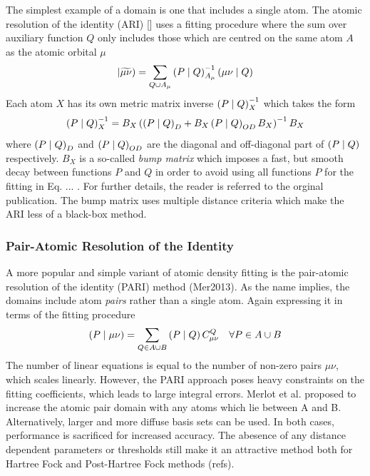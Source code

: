 The simplest example of a domain is one that includes a single atom. The atomic resolution of the identity (ARI) [] uses a fitting procedure where the sum over auxiliary function $Q$ only includes those which are centred on the same atom $A$ as the atomic orbital $\mu$
\begin{equation}
\left\lvert \widetilde{\mu\nu} \right) = \sum_{Q \cup A_{\mu}} \left( P \mid Q \right)_{A_{\mu}}^{-1} \left( \mu\nu \mid Q \right)
\end{equation}
\noindent Each atom $X$ has its own metric matrix inverse $\left( P \mid Q \right)_X^{-1}$ which takes the form 
\begin{equation}
\left( P \mid Q \right)_X^{-1} = B_X \left( \left( P \mid Q \right)_D + B_X \left( P \mid Q \right)_{OD}B_X\right)^{-1}B_X
\end{equation}
\noindent where $\left( P \mid Q \right)_D$ and $\left( P \mid Q \right)_{OD}$ are the diagonal and off-diagonal part of $\left( P \mid Q \right)$ respectively. $B_X$ is a so-called \emph{bump matrix} which imposes a fast, but smooth decay between functions $P$ and $Q$ in order to avoid using all functions $P$ for the fitting in Eq. ... . For further details, the reader is referred to the orginal publication. The bump matrix uses multiple distance criteria which make the ARI less of a black-box method.


\subsubsection{Pair-Atomic Resolution of the Identity}

A more popular and simple variant of atomic density fitting is the pair-atomic resolution of the identity (PARI) method (Mer2013). As the name implies, the domains include atom \emph{pairs} rather than a single atom. Again expressing it in terms of the fitting procedure
\begin{equation}
\left( P \mid \mu\nu \right) = \sum_{Q \in A \cup B} \left( P \mid Q \right) C^Q_{\mu\nu} \quad \forall P \in A \cup B
\end{equation}
\noindent The number of linear equations is equal to the number of non-zero pairs $\mu\nu$, which scales linearly. However, the PARI approach poses heavy constraints on the fitting coefficients, which leads to large integral errors. Merlot et al. proposed to increase the atomic pair domain with any atoms which lie between A and B. Alternatively, larger and more diffuse basis sets can be used. In both cases, performance is sacrificed for increased accuracy. The abesence of any distance dependent parameters or thresholds still make it an attractive method both for Hartree Fock and Post-Hartree Fock methods (refs).

